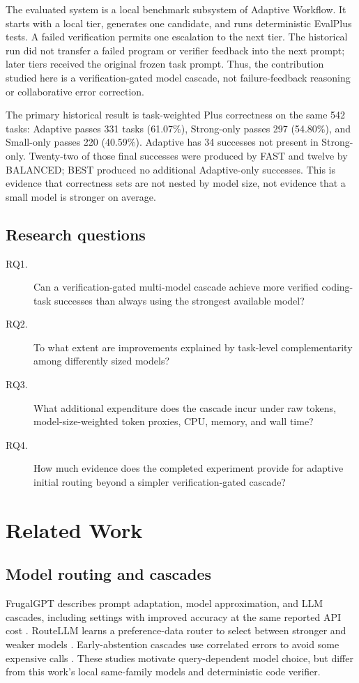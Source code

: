 \documentclass[10pt]{article}
\begin{document}
The evaluated system is a local benchmark subsystem of Adaptive Workflow. It
starts with a local tier, generates one candidate, and runs deterministic
EvalPlus tests. A failed verification permits one escalation to the next tier.
The historical run did not transfer a failed program or verifier feedback into
the next prompt; later tiers received the original frozen task prompt. Thus,
the contribution studied here is a verification-gated model cascade, not
failure-feedback reasoning or collaborative error correction.

The primary historical result is task-weighted Plus correctness on the same
542 tasks: Adaptive passes 331 tasks (61.07\%), Strong-only passes 297
(54.80\%), and Small-only passes 220 (40.59\%). Adaptive has 34 successes not
present in Strong-only. Twenty-two of those final successes were produced by
FAST and twelve by BALANCED; BEST produced no additional Adaptive-only
successes. This is evidence that correctness sets are not nested by model
size, not evidence that a small model is stronger on average.

\subsection{Research questions}
\begin{description}
\item[RQ1.] Can a verification-gated multi-model cascade achieve more verified
coding-task successes than always using the strongest available model?
\item[RQ2.] To what extent are improvements explained by task-level
complementarity among differently sized models?
\item[RQ3.] What additional expenditure does the cascade incur under raw
tokens, model-size-weighted token proxies, CPU, memory, and wall time?
\item[RQ4.] How much evidence does the completed experiment provide for
adaptive initial routing beyond a simpler verification-gated cascade?
\end{description}

\section{Related Work}
\subsection{Model routing and cascades}
FrugalGPT describes prompt adaptation, model approximation, and LLM cascades,
including settings with improved accuracy at the same reported API cost
\cite{chen2024frugalgpt}. RouteLLM learns a preference-data router to select
between stronger and weaker models \cite{ong2025routellm}. Early-abstention
cascades use correlated errors to avoid some expensive calls
\cite{zellinger2025abstention}. These studies motivate query-dependent model
choice, but differ from this work's local same-family models and deterministic
code verifier.
\end{document}

